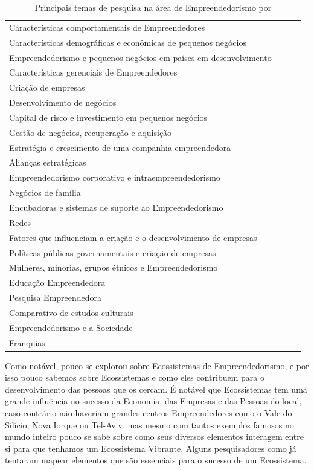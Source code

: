 \begin{table}[!htb]
\centering
\caption{Principais temas de pesquisa na área de Empreendedorismo por \cite{Filion1998}}
\label{tabela:principais_temas_de_pesquisa_na_area_de_empreendedorismo}
\begin{tabular}{llll}
Características comportamentais de Empreendedores \\
Características demográficas e econômicas de pequenos negócios \\
Empreendedorismo e pequenos negócios em países em desenvolvimento \\
Características gerenciais de Empreendedores \\
Criação de empresas \\
Desenvolvimento de negócios \\
Capital de risco e investimento em pequenos negócios \\
Gestão de negócios, recuperação e aquisição \\
Estratégia e crescimento de uma companhia empreendedora \\
Alianças estratégicas \\
Empreendedorismo corporativo e intraempreendedorismo \\
Negócios de família \\
Encubadoras e sistemas de suporte ao Empreendedorismo \\
Redes \\
Fatores que influenciam a criação e o desenvolvimento de empresas \\
Políticas públicas governamentais e criação de empresas \\
Mulheres, minorias, grupos étnicos e Empreendedorismo \\
Educação Empreendedora \\
Pesquisa Empreendedora \\
Comparativo de estudos culturais\\
Empreendedorismo e a Sociedade \\
Franquias \\
\end{tabular}
\end{table}

Como notável, pouco se explorou sobre Ecossistemas de Empreendedorismo, e por isso pouco sabemos sobre Ecossistemas e como eles contribuem para o desenvolvimento das pessoas que os cercam. É notável que Ecossistemas tem uma grande influência no sucesso da Economia, das Empresas e das Pessoas do local, caso contrário não haveriam grandes centros Empreendedores como o Vale do Silício, Nova Iorque ou Tel-Aviv, mas mesmo com tantos exemplos famosos no mundo inteiro pouco se sabe sobre como seus diversos elementos interagem entre si para que tenhamos um Ecossistema Vibrante. Alguns pesquisadores como  já tentaram mapear elementos que são essenciais para o sucesso de um Ecossistema.

